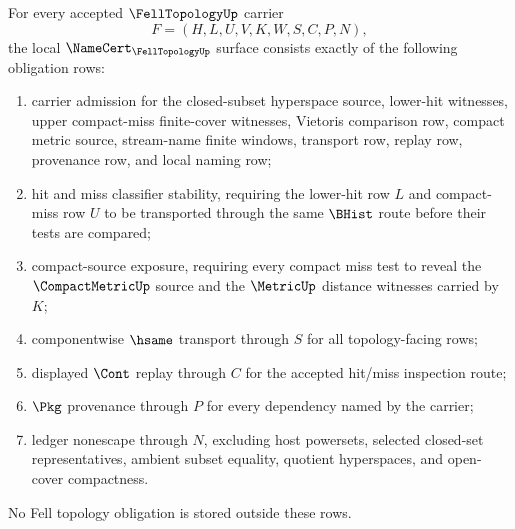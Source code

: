 \begin{theorem}
\label{thm:fell-topology-namecert-obligations}
For every accepted $\FellTopologyUp$ carrier
$$
F=(H,L,U,V,K,W,S,C,P,N),
$$
the local $\NameCert_{\FellTopologyUp}$ surface consists exactly of the following obligation rows:
\begin{enumerate}
\item carrier admission for the closed-subset hyperspace source, lower-hit witnesses, upper compact-miss finite-cover witnesses, Vietoris comparison row, compact metric source, stream-name finite windows, transport row, replay row, provenance row, and local naming row;
\item hit and miss classifier stability, requiring the lower-hit row $L$ and compact-miss row $U$ to be transported through the same $\BHist$ route before their tests are compared;
\item compact-source exposure, requiring every compact miss test to reveal the $\CompactMetricUp$ source and the $\MetricUp$ distance witnesses carried by $K$;
\item componentwise $\hsame$ transport through $S$ for all topology-facing rows;
\item displayed $\Cont$ replay through $C$ for the accepted hit/miss inspection route;
\item $\Pkg$ provenance through $P$ for every dependency named by the carrier;
\item ledger nonescape through $N$, excluding host powersets, selected closed-set representatives, ambient subset equality, quotient hyperspaces, and open-cover compactness.
\end{enumerate}
No Fell topology obligation is stored outside these rows.
\end{theorem}

